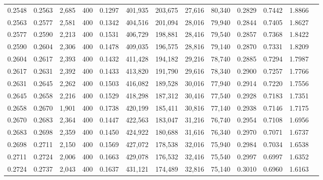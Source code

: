 \begin{tabular}{rrrrrrrrrrrrr}
0.2548 & 0.2563 &  2,685 &   400 &                                     0.1297 & 401,935 & 203,675 &  27,616 &  80,340 & 0.2829 & 0.7442 & 1.8866 \\
0.2563 & 0.2577 &  2,581 &   400 &                                     0.1342 & 404,516 & 201,094 &  28,016 &  79,940 & 0.2844 & 0.7405 & 1.8627 \\
0.2577 & 0.2590 &  2,213 &   400 &                                     0.1531 & 406,729 & 198,881 &  28,416 &  79,540 & 0.2857 & 0.7368 & 1.8422 \\
0.2590 & 0.2604 &  2,306 &   400 &                                     0.1478 & 409,035 & 196,575 &  28,816 &  79,140 & 0.2870 & 0.7331 & 1.8209 \\
0.2604 & 0.2617 &  2,393 &   400 &                                     0.1432 & 411,428 & 194,182 &  29,216 &  78,740 & 0.2885 & 0.7294 & 1.7987 \\
0.2617 & 0.2631 &  2,392 &   400 &                                     0.1433 & 413,820 & 191,790 &  29,616 &  78,340 & 0.2900 & 0.7257 & 1.7766 \\
0.2631 & 0.2645 &  2,262 &   400 &                                     0.1503 & 416,082 & 189,528 &  30,016 &  77,940 & 0.2914 & 0.7220 & 1.7556 \\
0.2645 & 0.2658 &  2,216 &   400 &                                     0.1529 & 418,298 & 187,312 &  30,416 &  77,540 & 0.2928 & 0.7183 & 1.7351 \\
0.2658 & 0.2670 &  1,901 &   400 &                                     0.1738 & 420,199 & 185,411 &  30,816 &  77,140 & 0.2938 & 0.7146 & 1.7175 \\
0.2670 & 0.2683 &  2,364 &   400 &                                     0.1447 & 422,563 & 183,047 &  31,216 &  76,740 & 0.2954 & 0.7108 & 1.6956 \\
0.2683 & 0.2698 &  2,359 &   400 &                                     0.1450 & 424,922 & 180,688 &  31,616 &  76,340 & 0.2970 & 0.7071 & 1.6737 \\
0.2698 & 0.2711 &  2,150 &   400 &                                     0.1569 & 427,072 & 178,538 &  32,016 &  75,940 & 0.2984 & 0.7034 & 1.6538 \\
0.2711 & 0.2724 &  2,006 &   400 &                                     0.1663 & 429,078 & 176,532 &  32,416 &  75,540 & 0.2997 & 0.6997 & 1.6352 \\
0.2724 & 0.2737 &  2,043 &   400 &                                     0.1637 & 431,121 & 174,489 &  32,816 &  75,140 & 0.3010 & 0.6960 & 1.6163 \\

\end{tabular}
